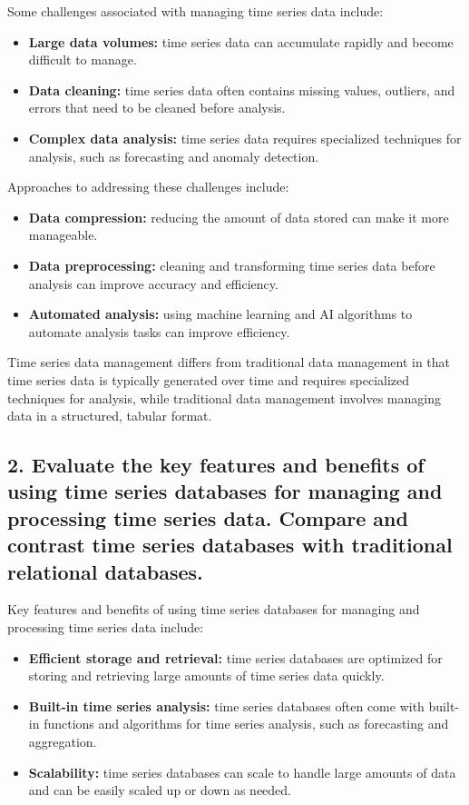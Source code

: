 \documentclass[12pt, a4paper, oneside]{article}
\begin{document}
Some challenges associated with managing time series data include:

\begin{itemize}
	\item \textbf{Large data volumes:} time series data can accumulate rapidly and become difficult to manage.
	\item \textbf{Data cleaning:} time series data often contains missing values, outliers, and errors that need to be cleaned before analysis.
	\item \textbf{Complex data analysis:} time series data requires specialized techniques for analysis, such as forecasting and anomaly detection.
\end{itemize}

Approaches to addressing these challenges include:

\begin{itemize}
	\item \textbf{Data compression:} reducing the amount of data stored can make it more manageable.
	\item \textbf{Data preprocessing:} cleaning and transforming time series data before analysis can improve accuracy and efficiency.
	\item \textbf{Automated analysis:} using machine learning and AI algorithms to automate analysis tasks can improve efficiency.
\end{itemize}

Time series data management differs from traditional data management in that time series data is typically generated over time and requires specialized techniques for analysis, while traditional data management involves managing data in a structured, tabular format.

\subsection{2. Evaluate the key features and benefits of using time series databases for managing and processing time series data. Compare and contrast time series databases with traditional relational databases.}

Key features and benefits of using time series databases for managing and processing time series data include:

\begin{itemize}
	\item \textbf{Efficient storage and retrieval:} time series databases are optimized for storing and retrieving large amounts of time series data quickly.
	\item \textbf{Built-in time series analysis:} time series databases often come with built-in functions and algorithms for time series analysis, such as forecasting and aggregation.
	\item \textbf{Scalability:} time series databases can scale to handle large amounts of data and can be easily scaled up or down as needed.
\end{itemize}
\end{document}
